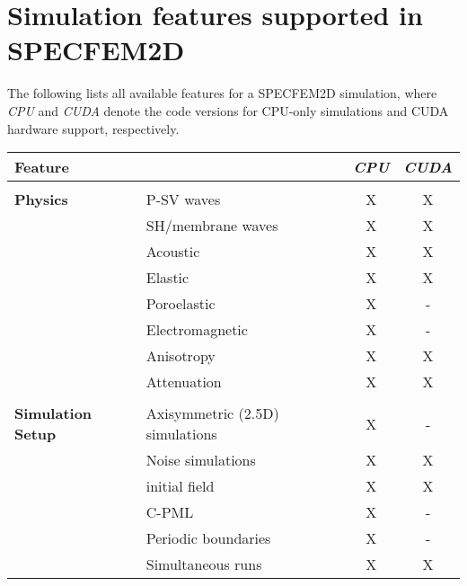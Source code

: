\chapter*{Simulation features supported in SPECFEM2D}

The following lists all available features for a SPECFEM2D simulation,
where {\it CPU} and {\it CUDA} denote the code versions for CPU-only simulations and
CUDA hardware support, respectively.
%
\begin{table}[htp]
\vspace{-1cm}
\label{table:features}
\begin{center}
\begin{tabular}{ l l c c}
\hline
{\bf Feature}   &   & {\it CPU} & {\it CUDA} \\
\hline
& & & \\
{\bf Physics}   & P-SV waves                & X  & X \\
                & SH/membrane waves         & X  & X \\
                & Acoustic                  & X  & X \\
                & Elastic                   & X  & X \\
                & Poroelastic               & X  & - \\
                & Electromagnetic       & X  & - \\
                & Anisotropy                & X  & X \\
                & Attenuation               & X  & X \\
\hline
& & & \\
{\bf Simulation Setup}  & Axisymmetric (2.5D) simulations   & X  & - \\
                        & Noise simulations                 & X  & X \\
                        & initial field                     & X  & X \\
                        & C-PML                             & X  & - \\
                        & Periodic boundaries               & X  & - \\
                        & Simultaneous runs                 & X  & X \\

\end{tabular}
\end{center}
\end{table}
